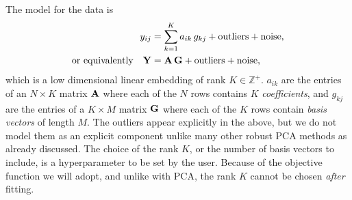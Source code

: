 \documentclass[onecolumn,floatfix]{aastex631}
\newcommand{\tom}[1]{\textcolor{teal}{\textbf{TH says:} #1}}
\newcommand{\hogg}[1]{\textcolor{red}{\textbf{DWH says:} #1}}
\begin{document}
The model for the data is
\begin{align}
    y_{ij} &= \sum_{k=1}^K a_{ik}\,g_{kj} + \rm{outliers} + \rm{noise}, \\
    \rm{or \,\, equivalently} \quad {\bf Y} &= {\bf A}\,{\bf G} + \rm{outliers} + \rm{noise}, \label{eq:model}
\end{align}
which is a low dimensional linear embedding of rank $K\in\mathbb{Z}^+$.
$a_{ik}$ are the entries of an $N \times K$ matrix ${\bf A}$ where each of the $N$ rows contains $K$ \emph{coefficients}, and $g_{kj}$ are the entries of a $K \times M$ matrix ${\bf G}$ where each of the $K$ rows contain \emph{basis vectors} of length $M$.
The outliers appear explicitly in the above, but we do not model them as an explicit component unlike many other robust PCA methods as already discussed.
The choice of the rank $K$, or the number of basis vectors to include, is a hyperparameter to be set by the user.
Because of the objective function we will adopt, and unlike with PCA, the rank $K$ cannot be chosen \emph{after} fitting.
\end{document}

